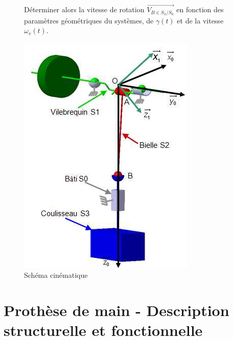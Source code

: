 \begin{figure}[htbp]
\begin{minipage}[c]{.55\linewidth}
Déterminer alors la vitesse de rotation $\overrightarrow{V_{B \in S_3/S_0}}$ en fonction des paramètres géométriques du systèmes, de $\gamma(t)$ et de la vitesse $\omega_v(t)$.
\end{minipage}
\hfill
\begin{minipage}[c]{.4\linewidth}
\begin{center}
\includegraphics[width=\linewidth]{img/Poinc_cin.png}
\caption{Schéma cinématique}
\label{fig:image19}
\end{center}
\end{minipage}
\end{figure}

\newpage

\section{Prothèse de main - Description structurelle et fonctionnelle}

